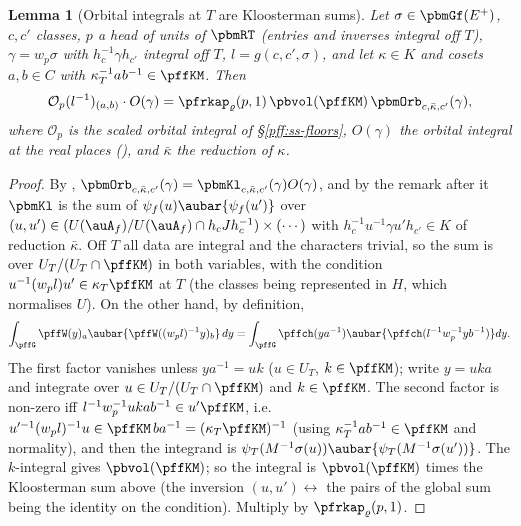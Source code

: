 \documentclass[10pt]{amsart}
\newtheorem{lemma}[theorem]{Lemma}
\theoremstyle{definition}
\theoremstyle{remark}
\begin{document}
\begin{lemma}[Orbital integrals at $T$ are Kloosterman sums]\label{pff:locKl}
Let $\sigma\in\pbmGf(E^+)$, $c,c'$ classes, $p$ a head of units of $\pbmRT$ (entries and inverses integral
off $T$), $\gamma=w_p\sigma$ with $h_c^{-1}\gamma h_{c'}$ integral off $T$, $l=g(c,c',\sigma)$, and let
$\kappa\in K$ and cosets $a,b\in C$ with $\kappa_T^{-1}a_{\vphantom{1}}b^{-1}\in\pffKM$. Then
\[
\mathcal O_p(l^{-1})_{(a,b)}\cdot O(\gamma)=\pfrkap_\varrho(p,1)\,\pbvol(\pffKM)\,\pbmOrb_{c,\bar\kappa,c'}(\gamma),
\]
where $\mathcal O_p$ is the scaled orbital integral of \S\ref{pff:ss-floors}, $O(\gamma)$ the orbital integral
at the real places ({\cite[\S3.3.2]{P51}}), and $\bar\kappa$ the reduction of $\kappa$.
\end{lemma}
\begin{proof}
By {\cite[Proposition~3.42]{P51}}, $\pbmOrb_{c,\bar\kappa,c'}(\gamma)=\pbmKl_{c,\bar\kappa,c'}(\gamma)O(\gamma)$, and by
the remark after it $\pbmKl$ is the sum of $\psi_f(u)\aubar{\psi_f(u')}$ over $(u,u')\in(U(\auA_f)/U(\auA_f)\cap
h_cJh_c^{-1})\times(\cdots)$ with $h_c^{-1}u^{-1}\gamma u'h_{c'}\in K$ of reduction $\bar\kappa$. Off $T$ all
data are integral and the characters trivial, so the sum is over $U_T/(U_T\cap\pffKM)$ in both variables,
with the condition $u^{-1}(w_pl)u'\in\kappa_T\pffKM$ at $T$ (the classes being represented in $H$, which
normalises $U$). On the other hand, by definition,
\[
\int_{\pffG}\pffW(y)_a\aubar{\pffW((w_pl)^{-1}y)_b}\,dy=\int_{\pffG}\pffch(ya^{-1})\aubar{\pffch(l^{-1}w_p^{-1}yb^{-1})}dy .
\]
The first factor vanishes unless $ya^{-1}=uk$ ($u\in U_T$, $k\in\pffKM$); write $y=uka$ and integrate over
$u\in U_T/(U_T\cap\pffKM)$ and $k\in\pffKM$. The second factor is non-zero iff $l^{-1}w_p^{-1}uka b^{-1}\in
u'\pffKM$, i.e.\ $u'^{-1}(w_pl)^{-1}u\in\pffKM\,ba^{-1}=(\kappa_T\pffKM)^{-1}$ (using $\kappa_T^{-1}ab^{-1}\in\pffKM$
and normality), and then the integrand is $\psi_T(M^{-1}\sigma(u))\aubar{\psi_T(M^{-1}\sigma(u'))}$. The
$k$-integral gives $\pbvol(\pffKM)$; so the integral is $\pbvol(\pffKM)$ times the Kloosterman sum above (the
inversion $(u,u')\leftrightarrow$ the pairs of the global sum being the identity on the condition). Multiply by
$\pfrkap_\varrho(p,1)$.
\end{proof}
\end{document}
